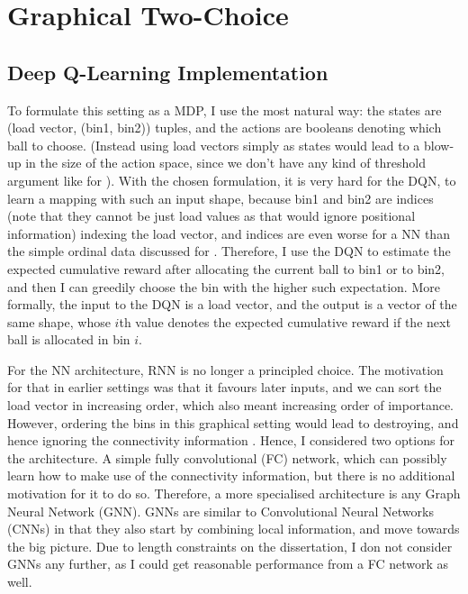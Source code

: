 \section{Graphical Two-Choice}



\subsection{Deep Q-Learning Implementation} \label{graphical-DQN}

To formulate this setting as a MDP, I use the most natural way: the states are (load vector, (bin1, bin2)) tuples, and the actions are booleans denoting which ball to choose. (Instead using load vectors simply as states would lead to a blow-up in the size of the action space, since we don't have any kind of threshold argument like for \TwoThinning). With the chosen formulation, it is very hard for the DQN, to learn a mapping with such an input shape, because bin1 and bin2 are indices (note that they cannot be just load values as that would ignore positional information) indexing the load vector, and indices are even worse for a NN than the simple ordinal data discussed for \TwoThinning {}. Therefore, I use the DQN to estimate the expected cumulative reward after allocating the current ball to bin1 or to bin2, and then I can greedily choose the bin with the higher such expectation. More formally, the input to the DQN is a load vector, and the output is a vector of the same shape, whose $i$th value denotes the expected cumulative reward if the next ball is allocated in bin $i$.  


For the NN architecture, RNN is no longer a principled choice. The motivation for that in earlier settings was that it favours later inputs, and we can sort the load vector in increasing order, which also meant increasing order of importance. However, ordering the bins in this graphical setting would lead to destroying, and hence ignoring the connectivity information . Hence, I considered two options for the architecture. A simple fully convolutional (FC) network, which can possibly learn how to make use of the connectivity information, but there is no additional motivation for it to do so. Therefore, a more specialised architecture is any Graph Neural Network (GNN). GNNs are similar to Convolutional Neural Networks (CNNs) in that they also start by combining local information, and move towards the big picture. Due to length constraints on the dissertation, I don not consider GNNs any further, as I could get reasonable performance from a FC network as well. 



